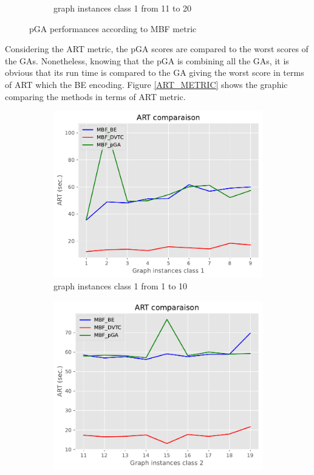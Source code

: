 \documentclass[review]{elsarticle}
\begin{document}
\begin{center}
\begin{figure}[H]
\begin{subfigure}{0.45\textwidth}
			\caption{\label{MBF_METRIC_C2} graph instances class 1 from 11 to 20}
		\end{subfigure}
		\caption{\label{MBF_METRIC}pGA performances according to MBF metric}
		
	\end{figure}
\end{center}
Considering the ART metric, the pGA scores are compared to the worst scores of the GAs. Nonetheless, knowing that the pGA is combining all the GAs, it is obvious that its run time is compared to the GA giving the worst score in terms of ART which the BE encoding. Figure \ref{ART_METRIC} shows the graphic comparing the methods in terms of ART metric.
\begin{center}
	\begin{figure}[H]
		\begin{subfigure}{0.45\textwidth}
			\includegraphics[width=\textwidth]{figurePaper/ART_C1.pdf} 
			\caption{\label{ART_METRIC_C1} graph instances class 1 from 1 to 10}
		\end{subfigure}
		\hfill
		\begin{subfigure}{0.45\textwidth}
			\includegraphics[width=\textwidth]{figurePaper/ART_C2.pdf} 

\end{subfigure}
\end{figure}
\end{center}
\end{document}
